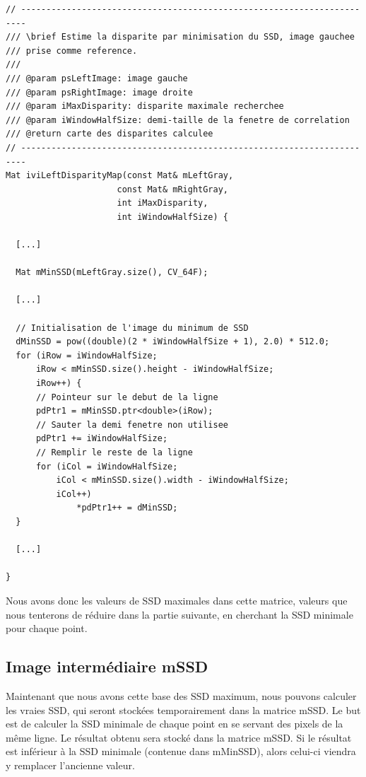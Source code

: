 \documentclass[a4paper]{article}
\begin{document}
\begin{lstlisting}
// -----------------------------------------------------------------------
/// \brief Estime la disparite par minimisation du SSD, image gauchee
/// prise comme reference.
///
/// @param psLeftImage: image gauche
/// @param psRightImage: image droite
/// @param iMaxDisparity: disparite maximale recherchee
/// @param iWindowHalfSize: demi-taille de la fenetre de correlation
/// @return carte des disparites calculee
// -----------------------------------------------------------------------
Mat iviLeftDisparityMap(const Mat& mLeftGray,
                      const Mat& mRightGray,
                      int iMaxDisparity,
                      int iWindowHalfSize) {

  [...]

  Mat mMinSSD(mLeftGray.size(), CV_64F);

  [...]

  // Initialisation de l'image du minimum de SSD
  dMinSSD = pow((double)(2 * iWindowHalfSize + 1), 2.0) * 512.0;
  for (iRow = iWindowHalfSize;
      iRow < mMinSSD.size().height - iWindowHalfSize;
      iRow++) {
      // Pointeur sur le debut de la ligne
      pdPtr1 = mMinSSD.ptr<double>(iRow);
      // Sauter la demi fenetre non utilisee
      pdPtr1 += iWindowHalfSize;
      // Remplir le reste de la ligne
      for (iCol = iWindowHalfSize;
          iCol < mMinSSD.size().width - iWindowHalfSize;
          iCol++)
              *pdPtr1++ = dMinSSD;
  }

  [...]

}
\end{lstlisting}

Nous avons donc les valeurs de SSD maximales dans cette matrice, valeurs que nous tenterons de réduire dans la partie suivante, en cherchant la SSD minimale pour chaque point.

\subsection{Image intermédiaire mSSD}

Maintenant que nous avons cette base des SSD maximum, nous pouvons calculer les vraies SSD, qui seront stockées temporairement dans la matrice mSSD.
Le but est de calculer la SSD minimale de chaque point en se servant des pixels de la même ligne. Le résultat obtenu sera stocké dans la matrice mSSD. Si le résultat est inférieur à la SSD minimale (contenue dans mMinSSD), alors celui-ci viendra y remplacer l'ancienne valeur.
\end{document}
